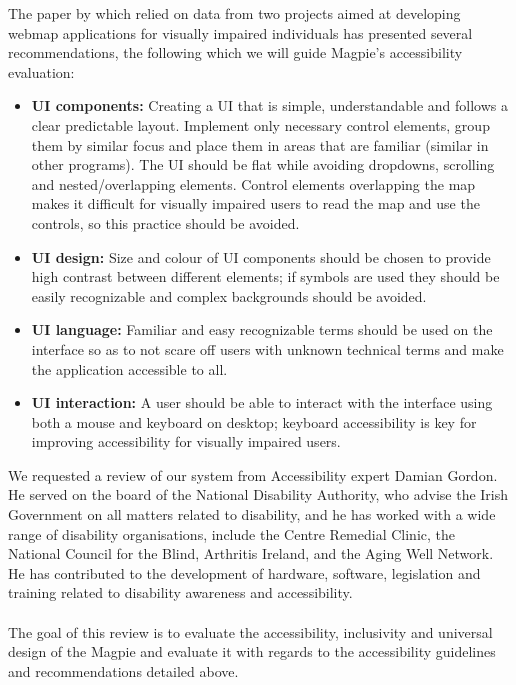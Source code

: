 \noindent The paper by \cite{accessibilitywebmapsrecommendations2017} which relied on data from two projects aimed at developing web\-map applications for visually impaired individuals has presented several recommendations, the following which we will guide Magpie's accessibility evaluation:
\begin{itemize}
    \item\textbf{UI components:} Creating a UI that is simple, understandable and follows a clear predictable layout. Implement only necessary control elements, group them by similar focus and place them in areas that are familiar (similar in other programs). The UI should be flat while avoiding dropdowns, scrolling and nested/overlapping elements. Control elements overlapping the map makes it difficult for visually impaired users to read the map and use the controls, so this practice should be avoided.
    \item\textbf{UI design:} Size and colour of UI components should be chosen to provide high contrast between different elements; if symbols are used they should be easily recognizable and complex backgrounds should be avoided.
    \item\textbf{UI language:} Familiar and easy recognizable terms should be used on the interface so as to not scare off users with unknown technical terms and make the application accessible to all.
    \item\textbf{UI interaction:} A user should be able to interact with the interface using both a mouse and keyboard on desktop; keyboard accessibility is key for improving accessibility for visually impaired users.
\end{itemize}

\noindent We requested a review of our system from Accessibility expert Damian Gordon.\\
He served on the board of the National Disability Authority, who advise the Irish Government on all matters related to disability, and he has worked with a wide range of disability organisations, include the Centre Remedial Clinic, the National Council for the Blind, Arthritis Ireland, and the Aging Well Network. He has contributed to the development of hardware, software, legislation and training related to disability awareness and accessibility. \\\\

\noindent The goal of this review is to evaluate the accessibility, inclusivity and universal design of the Magpie and evaluate it with regards to the accessibility guidelines and recommendations detailed above.\\

